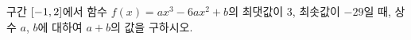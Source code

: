구간 $[-1{,}\mkern3mu\mathopen{}2]$에서 함수 $f(x)=ax^3-6ax^2+b$의 최댓값이 $3$, 최솟값이 $-29$일 때, 상수 $a$, $b$에 대하여 $a+b$의 값을 구하시오. 
